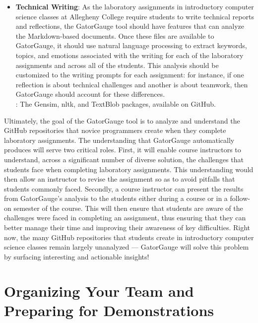 \documentclass[11pt]{article}
\begin{document}
\begin{itemize}
  \item {\bf Technical Writing}: As the laboratory assignments in introductory computer science classes at Allegheny
    College require students to write technical reports and reflections, the GatorGauge tool should have features that
    can analyze the Markdown-based documents. Once these files are available to GatorGauge, it should use natural
    language processing to extract keywords, topics, and emotions associated with the writing for each of the laboratory
    assignments and across all of the students. This analysis should be customized to the writing prompts for each
    assignment: for instance, if one reflection is about technical challenges and another is about teamwork, then
    GatorGauge should account for these differences. \\[.5em] : The Gensim, nltk, and
    TextBlob packages, available on GitHub.

\end{itemize}

Ultimately, the goal of the GatorGauge tool is to analyze and understand the GitHub repositories that novice programmers
create when they complete laboratory assignments. The understanding that GatorGauge automatically produces will serve
two critical roles. First, it will enable course instructors to understand, across a significant number of diverse
solution, the challenges that students face when completing laboratory assignments. This understanding would then allow
an instructor to revise the assignment so as to avoid pitfalls that students commonly faced. Secondly, a course
instructor can present the results from GatorGauge's analysis to the students either during a course or in a follow-on
semester of the course. This will then ensure that students are aware of the challenges were faced in completing an
assignment, thus ensuring that they can better manage their time and improving their awareness of key difficulties.
Right now, the many GitHub repositories that students create in introductory computer science classes remain largely
unanalyzed --- GatorGauge will solve this problem by surfacing interesting and actionable insights!

\section*{Organizing Your Team and Preparing for Demonstrations}
\end{document}
